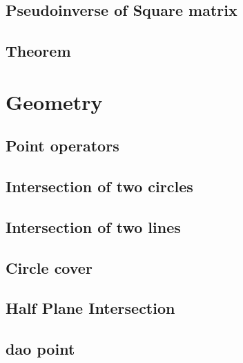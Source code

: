 \documentclass[a4paper,10pt,twocolumn,oneside]{article}
\begin{document}
\subsection{Pseudoinverse of Square matrix}


\subsection{Theorem}



\section{Geometry}
\subsection{Point operators}


\subsection{Intersection of two circles}
%


\subsection{Intersection of two lines}


\subsection{Circle cover}


\subsection{Half Plane Intersection}


\subsection{dao point}

\end{document}
